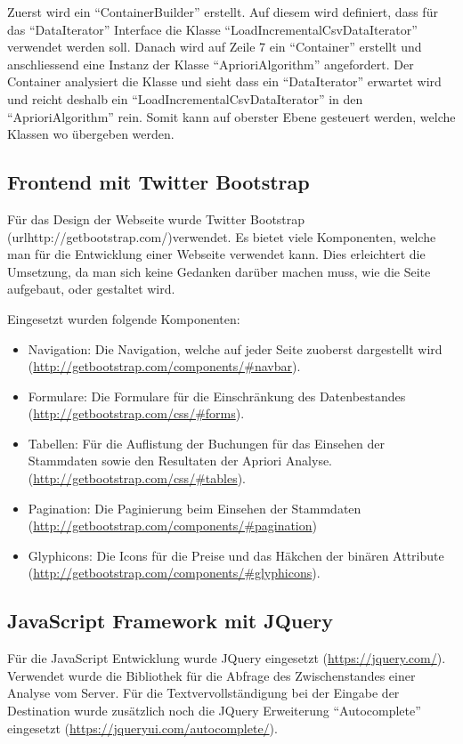 Zuerst wird ein "`ContainerBuilder"' erstellt. Auf diesem wird definiert, dass für das "`DataIterator"' Interface die Klasse "`LoadIncrementalCsvDataIterator"' verwendet werden soll. Danach wird auf Zeile 7 ein "`Container"' erstellt und anschliessend eine Instanz der Klasse "`AprioriAlgorithm"' angefordert. Der Container analysiert die Klasse und sieht dass ein "`DataIterator"' erwartet wird und reicht deshalb ein "`LoadIncrementalCsvDataIterator"' in den "`AprioriAlgorithm"' rein. Somit kann auf oberster Ebene gesteuert werden, welche Klassen wo übergeben werden.

\subsection{Frontend mit Twitter Bootstrap}
\label{sec:proofofconcept:externebibliotheken:bootstrap}
Für das Design der Webseite wurde Twitter Bootstrap (url{http://getbootstrap.com/})verwendet. Es bietet viele Komponenten, welche man für die Entwicklung einer Webseite verwendet kann. Dies erleichtert die Umsetzung, da man sich keine Gedanken darüber machen muss, wie die Seite aufgebaut, oder gestaltet wird. 

Eingesetzt wurden folgende Komponenten:
\begin{itemize}
	\item Navigation: Die Navigation, welche auf jeder Seite zuoberst dargestellt wird (\url{http://getbootstrap.com/components/#navbar}).
	\item Formulare: Die Formulare für die Einschränkung des Datenbestandes (\url{http://getbootstrap.com/css/#forms}).
	\item Tabellen: Für die Auflistung der Buchungen für das Einsehen der Stammdaten sowie den Resultaten der Apriori Analyse. (\url{http://getbootstrap.com/css/#tables}).
	\item Pagination: Die Paginierung beim Einsehen der Stammdaten (\url{http://getbootstrap.com/components/#pagination})
	\item Glyphicons: Die Icons für die Preise und das Häkchen der binären Attribute (\url{http://getbootstrap.com/components/#glyphicons}).
\end{itemize}

\subsection{JavaScript Framework mit JQuery}
Für die JavaScript Entwicklung wurde JQuery eingesetzt (\url{https://jquery.com/}). Verwendet wurde die Bibliothek für die Abfrage des Zwischenstandes einer Analyse vom Server. Für die Textvervollständigung bei der Eingabe der Destination wurde zusätzlich noch die JQuery Erweiterung "`Autocomplete"' eingesetzt (\url{https://jqueryui.com/autocomplete/}).

